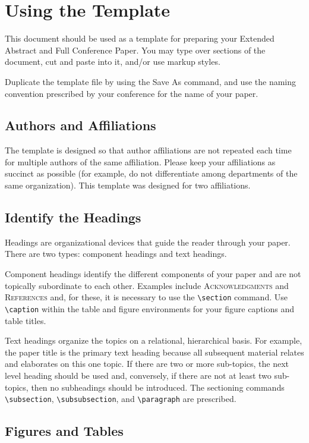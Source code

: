 \documentclass[conference]{IEEEtran}
\begin{document}
\section{Using the Template}
This document should be used as a template for preparing your Extended Abstract and Full Conference Paper. You may type over sections of the document, cut and paste into it, and/or use markup styles.

Duplicate the template file by using the Save As command, and use the naming convention prescribed by your conference for the name of your paper.

\subsection{Authors and Affiliations}
The template is designed so that author affiliations are not repeated each time for multiple authors of the same affiliation. Please keep your affiliations as succinct as possible (for example, do not differentiate among departments of the same organization). This template was designed for two affiliations.

\subsection{Identify the Headings}
Headings are organizational devices that guide the reader through your paper. There are two types: component headings and text headings.

Component headings identify the different components of your paper and are not topically subordinate to each other. Examples include \textsc{Acknowledgments} and \textsc{References} and, for these, it is necessary to use the \texttt{\textbackslash section} command. Use \texttt{\textbackslash caption} within the table and figure environments for your figure captions and table titles.

Text headings organize the topics on a relational, hierarchical basis. For example, the paper title is the primary text heading because all subsequent material relates and elaborates on this one topic. If there are two or more sub-topics, the next level heading should be used and, conversely, if there are not at least two sub-topics, then no subheadings should be introduced. The sectioning commands \texttt{\textbackslash subsection}, \texttt{\textbackslash subsubsection}, and \texttt{\textbackslash paragraph} are prescribed.

\subsection{Figures and Tables}
\end{document}
